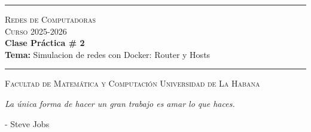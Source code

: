 \documentclass[12pt]{amsart}
\begin{document}
	\hrule
	\smallskip
	\begin{center}
		{\scshape {\large Redes de Computadoras} \\
			Curso 2025-2026} \\ \smallskip
		\textbf{Clase Práctica \# 2} \\
		{\small \textbf{Tema:} Simulacion de redes con Docker: Router y Hosts}
	\end{center}
	\vspace{-8px}
	\rule{\linewidth}{2pt}
	
	{\scshape Facultad de Matemática y Computación}  \hfill {\scshape Universidad de La Habana}
	
	\bigskip\bigskip
	
	
	
	\vspace{1cm}
	
	\begin{center}
		\textit{La única forma de hacer un gran trabajo es amar lo que haces.}
	\end{center}
	
	\begin{flushright}
		- Steve Jobs
	\end{flushright}
	
	\vspace{1cm}
	
\end{document}
